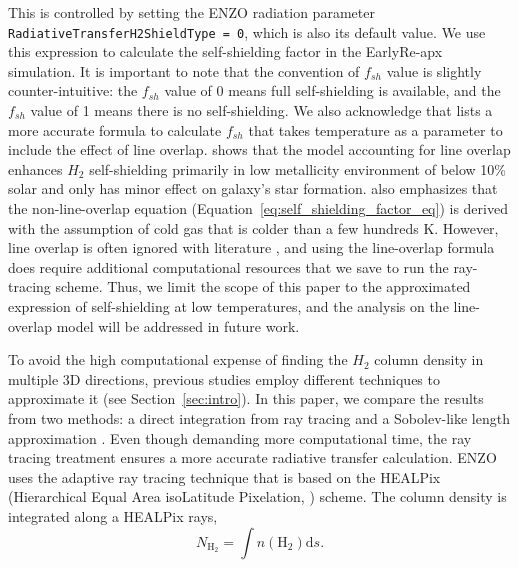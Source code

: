 \documentclass[linenumbers, twocolumn]{aastex631}
\begin{document}
This is controlled by setting the ENZO radiation parameter \texttt{RadiativeTransferH2ShieldType = 0}, which is also its default value. We use this expression to calculate the self-shielding factor in the EarlyRe-apx simulation. It is important to note that the convention of $f_{sh}$ value is slightly counter-intuitive: the $f_{sh}$ value of 0 means full self-shielding is available, and the $f_{sh}$ value of 1 means there is no self-shielding. We also acknowledge that \cite{Draine+1996} lists a more accurate formula to calculate $f_{sh}$ that takes temperature as a parameter to include the effect of line overlap. \cite{Gnedin+2014} shows that the model accounting for line overlap enhances $H_{2}$ self-shielding primarily in low metallicity environment of below 10\% solar and only has minor effect on galaxy's star formation. \cite{Wolcott-Green+2011} also emphasizes that the non-line-overlap equation (Equation~\ref{eq:self_shielding_factor_eq}) is derived with the assumption of cold gas that is colder than a few hundreds K. However, line overlap is often ignored with literature \citep{Gnedin+2011, Christensen+2012}, and using the line-overlap  formula does require additional computational resources that we save to run the ray-tracing scheme. Thus, we limit the scope of this paper to the approximated expression of self-shielding at low temperatures, and the analysis on the line-overlap model will be addressed in future work.

To avoid the high computational expense of finding the $H_{2}$ column density in multiple 3D directions, previous studies employ different techniques to approximate it (see Section~\ref{sec:intro}). In this paper, we compare the results from two methods: a direct integration from ray tracing and a Sobolev-like length approximation \citep{Gnedin+2009, Wolcott-Green+2011}. Even though demanding more computational time, the ray tracing treatment ensures a more accurate radiative transfer calculation. ENZO uses the adaptive ray tracing technique \citep{Wise+2011} that is based on the HEALPix (Hierarchical Equal Area isoLatitude Pixelation, \citealt{Gorski+2005}) scheme. The column density is integrated along a HEALPix rays,
\begin{equation}
    N_{\text{H}_{2}} = \int n(\text{H}_{2})\text{d}s.
\label{eq:NH2_approximation}
\end{equation}
\end{document}
